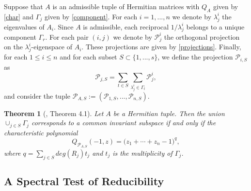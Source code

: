 \documentclass[draft, 12pt, reqno]{amsart}
\numberwithin{equation}{section}
\theoremstyle{plain}
\newtheorem{theorem}{Theorem}[section]
\begin{document}
Suppose that $A$ is an admissible tuple of Hermitian matrices with $Q_A$ given by \eqref{char} and $\Gamma_j$ given by \eqref{component}. 
For each $i=1,...,n$ we denote by $\lambda_j^i$ the eigenvalues of $A_i$. Since $A$ is admissible, each reciprocal $1/\lambda_j^i$ belongs to a unique component $\Gamma_r$. For each pair $(i,j)$ we denote by $\mathcal{P}_j^i$ the orthogonal projection on the $\lambda_j^i$-eigenspace of $A_i$. These projections are given by \eqref{projections}. Finally, for each $1\leq i \leq n$ and for each subset $S\subset \{1,...,s\}$, we define the projection $\mathscr{P}_{i,S}$ as
\begin{equation}\label{projections1}
{\mathscr P}_{j,{S}}=\displaystyle \sum_{t\in {S}}\sum_{\lambda_j^i\in \Gamma_t} {\mathcal P}_{j}^i,
\end{equation}
and consider the tuple ${\mathscr P}_{A,S}:=({\mathscr P}_{1,{S}},...,{\mathscr P}_{n,{S}})$. 

\begin{theorem}[\cite{SY}, Theorem 4.1]\label{reducible tuples}
Let $A$ be a Hermitian tuple. Then the union $\cup_{j\in {S} }\Gamma_j$ corresponds to a common invariant subspace if and only if the characteristic polynomial  
\begin{equation}\label{gamma projections}
Q_{{\mathscr P}_{A,S}}(-1,z)=\big(z_1+\cdots +z_{n}-1\big)^{q}, 
\end{equation}	
where $q=\displaystyle \sum_{j\in S} deg(R_j)t_j$ and $t_j$ is the multiplicity of $\Gamma_j$. 

\end{theorem}





\subsection{A Spectral Test of Reducibility}\label{test1}

\vspace{.2cm}
\end{document}
